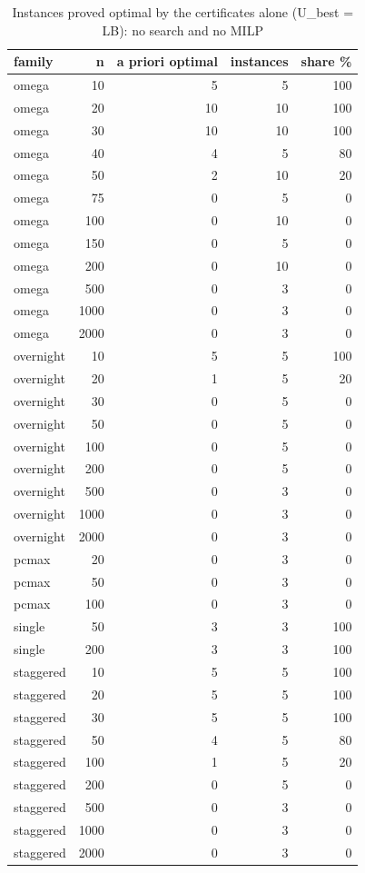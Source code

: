 \begin{table}[htbp]
\centering
\small
\caption{Instances proved optimal by the certificates alone (U\_best = LB): no search and no MILP}
\label{tab:E1_certificates_apriori}
\begin{tabular}{lrrrr}
\toprule
family & n & a priori optimal & instances & share \% \\
\midrule
omega & 10 & 5 & 5 & 100 \\
omega & 20 & 10 & 10 & 100 \\
omega & 30 & 10 & 10 & 100 \\
omega & 40 & 4 & 5 & 80 \\
omega & 50 & 2 & 10 & 20 \\
omega & 75 & 0 & 5 & 0 \\
omega & 100 & 0 & 10 & 0 \\
omega & 150 & 0 & 5 & 0 \\
omega & 200 & 0 & 10 & 0 \\
omega & 500 & 0 & 3 & 0 \\
omega & 1000 & 0 & 3 & 0 \\
omega & 2000 & 0 & 3 & 0 \\
overnight & 10 & 5 & 5 & 100 \\
overnight & 20 & 1 & 5 & 20 \\
overnight & 30 & 0 & 5 & 0 \\
overnight & 50 & 0 & 5 & 0 \\
overnight & 100 & 0 & 5 & 0 \\
overnight & 200 & 0 & 5 & 0 \\
overnight & 500 & 0 & 3 & 0 \\
overnight & 1000 & 0 & 3 & 0 \\
overnight & 2000 & 0 & 3 & 0 \\
pcmax & 20 & 0 & 3 & 0 \\
pcmax & 50 & 0 & 3 & 0 \\
pcmax & 100 & 0 & 3 & 0 \\
single & 50 & 3 & 3 & 100 \\
single & 200 & 3 & 3 & 100 \\
staggered & 10 & 5 & 5 & 100 \\
staggered & 20 & 5 & 5 & 100 \\
staggered & 30 & 5 & 5 & 100 \\
staggered & 50 & 4 & 5 & 80 \\
staggered & 100 & 1 & 5 & 20 \\
staggered & 200 & 0 & 5 & 0 \\
staggered & 500 & 0 & 3 & 0 \\
staggered & 1000 & 0 & 3 & 0 \\
staggered & 2000 & 0 & 3 & 0 \\
\bottomrule
\end{tabular}
\end{table}
